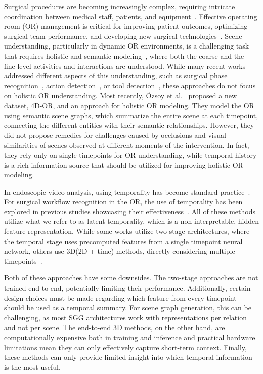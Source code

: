 \documentclass[runningheads]{llncs}
\begin{document}
Surgical procedures are becoming increasingly complex, requiring intricate coordination between medical staff, patients, and equipment~\cite{maier-hein_sds_2017,lalys2014}. Effective operating room (OR) management is critical for improving patient outcomes, optimizing surgical team performance, and developing new surgical technologies~\cite{kennedymetz2020}. Scene understanding, particularly in dynamic OR environments, is a challenging task that requires holistic and semantic modeling~\cite{lalys2014,ozsoy20224d}, where both the coarse and the fine-level activities and interactions are understood. 
While many recent works addressed different aspects of this understanding, such as surgical phase recognition~\cite{twinanda2016endonet,tecno,jin2020multi}, action detection~\cite{tripnet,rendezvous}, or tool detection~\cite{jha2021kvasir,ding2022carts}, these approaches do not focus on holistic OR understanding. Most recently, Özsoy et al.~\cite{ozsoy20224d} proposed a new dataset, 4D-OR, and an approach for holistic OR modeling. They model the OR using semantic scene graphs, which summarize the entire scene at each timepoint, connecting the different entities with their semantic relationships. However, they did not propose remedies for challenges caused by occlusions and visual similarities of scenes observed at different moments of the intervention. In fact, they rely only on single timepoints for OR understanding, while temporal history is a rich information source that should be utilized for improving holistic OR modeling. 

In endoscopic video analysis, using temporality has become standard practice~\cite{twinanda2016endonet,tecno,sharma2022rendezvous,gao2021trans}. For surgical workflow recognition in the OR, the use of temporality has been explored in previous studies showcasing their effectiveness~\cite{sharghi2020automatic,jamal2022multi,mottaghi2022adaptation}. All of these methods utilize what we refer to as latent temporality, which is a non-interpretable, hidden feature representation. While some works utilize two-stage architectures, where the temporal stage uses precomputed features from a single timepoint neural network, others use 3D(2D + time) methods, directly considering multiple timepoints~\cite{czempiel2023surgical}. 

Both of these approaches have some downsides. The two-stage approaches are not trained end-to-end, potentially limiting their performance. Additionally, certain design choices must be made regarding which feature from every timepoint should be used as a temporal summary. For scene graph generation, this can be challenging, as most SGG architectures work with representations per relation and not per scene. The end-to-end 3D methods, on the other hand, are computationally expensive both in training and inference and practical hardware limitations mean they can only effectively capture short-term context. Finally, these methods can only provide limited insight into which temporal information is the most useful. 
\end{document}
